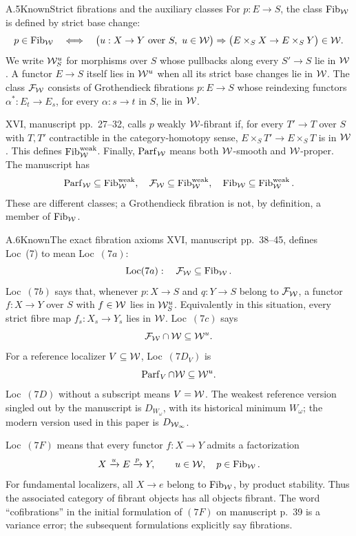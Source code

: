 \begin{claim}{A.5}{Known}{Strict fibrations and the auxiliary classes}
For $p:E\to S$, the class $\operatorname{Fib}_{\mathcal{W}}$ is defined by strict base change:
\[
p\in\operatorname{Fib}_{\mathcal{W}}\quad\Longleftrightarrow\quad
\bigl(u:X\to Y\text{ over }S,\ u\in\mathcal{W}\bigr)
\Rightarrow\bigl(E\times_S X\to E\times_S Y\bigr)\in\mathcal{W}.
\]
We write $\mathcal{W}_S^u$ for morphisms over $S$ whose pullbacks along every $S'\to S$ lie in $\mathcal{W}$. A functor $E\to S$ itself lies in $\mathcal{W}^u$ when all its strict base changes lie in $\mathcal{W}$. The class $\mathcal F_{\mathcal{W}}$ consists of Grothendieck fibrations $p:E\to S$ whose reindexing functors $\alpha^*:E_t\to E_s$, for every $\alpha:s\to t$ in $S$, lie in $\mathcal{W}$.

XVI, manuscript pp.~27--32, calls $p$ weakly $\mathcal{W}$-fibrant if, for every $T'\to T$ over $S$ with $T,T'$ contractible in the category-homotopy sense, $E\times_S T'\to E\times_S T$ is in $\mathcal{W}$. This defines $\operatorname{Fib}^{\mathrm{weak}}_{\mathcal{W}}$. Finally, $\operatorname{Parf}_{\mathcal{W}}$ means both $\mathcal{W}$-smooth and $\mathcal{W}$-proper. The manuscript has
\[
\operatorname{Parf}_{\mathcal{W}}\subseteq\operatorname{Fib}^{\mathrm{weak}}_{\mathcal{W}},\quad
\mathcal F_{\mathcal{W}}\subseteq\operatorname{Fib}^{\mathrm{weak}}_{\mathcal{W}},\quad
\operatorname{Fib}_{\mathcal{W}}\subseteq\operatorname{Fib}^{\mathrm{weak}}_{\mathcal{W}}.
\]
These are different classes; a Grothendieck fibration is not, by definition, a member of $\operatorname{Fib}_{\mathcal{W}}$.
\end{claim}

\begin{claim}{A.6}{Known}{The exact fibration axioms}
XVI, manuscript pp.~38--45, defines Loc~(7) to mean Loc~$(7a)$:
\[
\mathrm{Loc}(7a):\quad \mathcal F_{\mathcal{W}}\subseteq\operatorname{Fib}_{\mathcal{W}}.
\]
Loc~$(7b)$ says that, whenever $p:X\to S$ and $q:Y\to S$ belong to $\mathcal F_{\mathcal{W}}$, a functor $f:X\to Y$ over $S$ with $f\in\mathcal{W}$ lies in $\mathcal{W}_S^u$. Equivalently in this situation, every strict fibre map $f_s:X_s\to Y_s$ lies in $\mathcal{W}$. Loc~$(7c)$ says
\[
\mathcal F_{\mathcal{W}}\cap\mathcal{W}\subseteq\mathcal{W}^u.
\]
For a reference localizer $V\subseteq\mathcal{W}$, Loc~$(7D_V)$ is
\[
\operatorname{Parf}_V\cap\mathcal{W}\subseteq\mathcal{W}^u.
\]
Loc~$(7D)$ without a subscript means $V=\mathcal{W}$. The weakest reference version singled out by the manuscript is $D_{W_\omega}$, with its historical minimum $W_\omega$; the modern version used in this paper is $D_{\mathcal{W}_{\infty}}$.

Loc~$(7F)$ means that every functor $f:X\to Y$ admits a factorization
\[
X\xrightarrow{u}E\xrightarrow{p}Y,
\qquad u\in\mathcal{W},\quad p\in\operatorname{Fib}_{\mathcal{W}}.
\]
For fundamental localizers, all $X\to e$ belong to $\operatorname{Fib}_{\mathcal{W}}$, by product stability. Thus the associated category of fibrant objects has all objects fibrant. The word ``cofibrations'' in the initial formulation of $(7F)$ on manuscript p.~39 is a variance error; the subsequent formulations explicitly say fibrations.
\end{claim}


